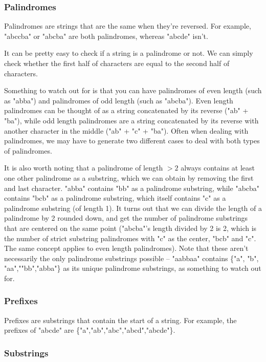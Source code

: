 \subsubsection{Palindromes}

Palindromes are strings that are the same when they're reversed. For example, "abccba" or "abcba" are both palindromes, whereas "abcde" isn't.

It can be pretty easy to check if a string is a palindrome or not. We can simply check whether the first half of characters are equal to the second half of characters.


Something to watch out for is that you can have palindromes of even length (such as "abba") and palindromes of odd length (such as "abcba"). Even length palindromes can be thought of as a string concatenated by its reverse ("ab" + "ba"), while odd length palindromes are a string concatenated by its reverse with another character in the middle ("ab" + "c" + "ba"). Often when dealing with palindromes, we may have to generate two different cases to deal with both types of palindromes.

It is also worth noting that a palindrome of length $> 2$ always contains at least one other palindrome as a substring, which we can obtain by removing the first and last character. "abba" contains "bb" as a palindrome substring, while "abcba" contains "bcb" as a palindrome substring, which itself contains "c" as a palindrome substring (of length 1). It turns out that we can divide the length of a palindrome by 2 rounded down, and get the number of palindrome substrings that are centered on the same point ("abcba"'s length divided by 2 is 2, which is the number of strict substring palindromes with "c" as the center, "bcb" and "c". The same concept applies to even length palindromes). Note that these aren't necessarily the only palindrome substrings possible -- "aabbaa" contains \{"a", "b", "aa",""bb","abba"\} as its unique palindrome substrings, as something to watch out for.

\subsubsection{Prefixes}

Prefixes are substrings that contain the start of a string. For example, the prefixes of "abcde" are \{"a","ab","abc","abcd","abcde"\}.

\subsubsection{Substrings}

